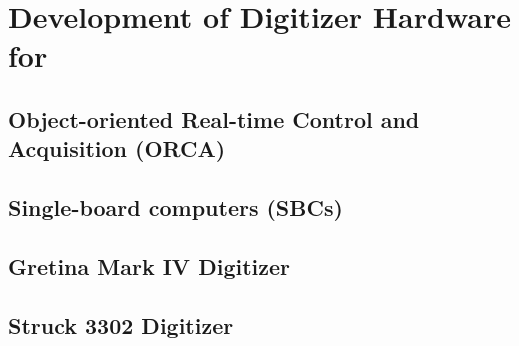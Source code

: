 
\chapter{Development of Digitizer Hardware for \MJ}
\label{app:ORCASoftwareChapter}

	\section{Object-oriented Real-time Control and Acquisition (ORCA)}

	\section{Single-board computers (SBCs)}
	\section{Gretina Mark IV Digitizer}
	\section{Struck 3302 Digitizer}

